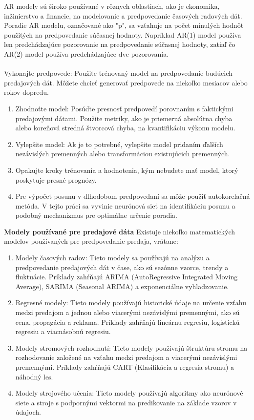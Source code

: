    AR modely sú široko používané v rôznych oblastiach, ako je ekonomika, inžinierstvo a financie, na modelovanie a predpovedanie časových radových dát.
    Poradie AR modelu, označované ako "p", sa vzťahuje na počet minulých hodnôt použitých na predpovedanie súčasnej hodnoty.
    Napríklad AR(1) model používa len predchádzajúce pozorovanie na predpovedanie súčasnej hodnoty, zatiaľ čo AR(2) model používa predchádzajúce
    dve pozorovania.\\
    \\
    Vykonajte predpovede: Použite trénovaný model na predpovedanie budúcich predajových dát. Môžete chcieť generovať predpovede na niekoľko
    mesiacov alebo rokov dopredu.
    \begin{enumerate}
        \item Zhodnoťte model: Posúďte presnosť predpovedí porovnaním s faktickými predajovými dátami. Použite metriky, ako je priemerná absolútna
        chyba alebo koreňová stredná štvorcová chyba, na kvantifikáciu výkonu modelu.
        \item Vylepšite model: Ak je to potrebné, vylepšite model pridaním ďalších nezávislých premenných alebo transformáciou existujúcich premenných.
        \item Opakujte kroky trénovania a hodnotenia, kým nebudete mať model, ktorý poskytuje presné prognózy.
        \item Pre výpočet posunu v dlhodobom predpovedaní sa môže použiť autokorelačná metóda. V tejto práci sa vyvinie neurónová sieť na identifikáciu
        posunu a podobný mechanizmus pre optimálne určenie poradia.
    \end{enumerate}
    \textbf{Modely používané pre predajové dáta}
    Existuje niekoľko matematických modelov používaných pre predpovedanie predaja, vrátane:\\
    \begin{enumerate}
        \item Modely časových radov: Tieto modely sa používajú na analýzu a predpovedanie predajových dát v čase, ako sú sezónne vzorce,
        trendy a fluktuácie. Príklady zahŕňajú ARIMA (AutoRegressive Integrated Moving Average), SARIMA (Seasonal ARIMA) a exponenciálne vyhladzovanie.
        \item Regresné modely: Tieto modely používajú historické údaje na určenie vzťahu medzi predajom a jednou alebo viacerými
        nezávislými premennými, ako sú cena, propagácia a reklama. Príklady zahŕňajú lineárnu regresiu, logistickú regresiu a viacnásobnú regresiu.
        \item Modely stromových rozhodnutí: Tieto modely používajú štruktúru stromu na rozhodovanie založené na vzťahu medzi
        predajom a viacerými nezávislými premennými. Príklady zahŕňajú CART (Klasifikácia a regresia stromu) a náhodný les.
        \item Modely strojového učenia: Tieto modely používajú algoritmy ako neurónové siete a stroje s podpornými
        vektormi na predikovanie na základe vzorov v údajoch.
    \end{enumerate}
